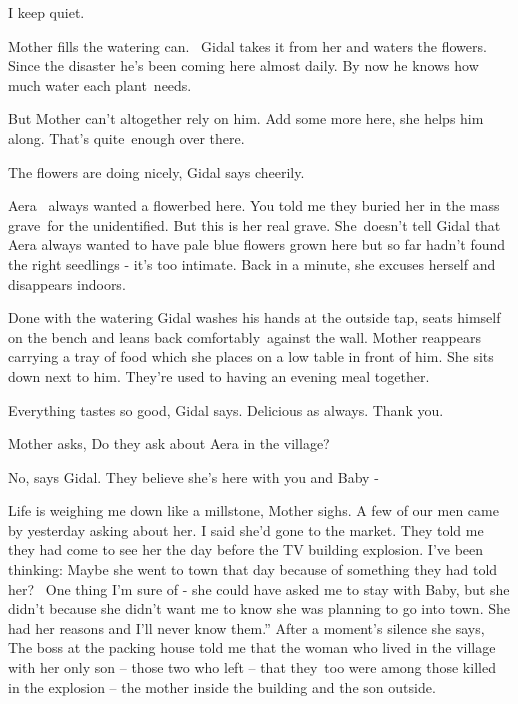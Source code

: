 \documentclass[letterpaper]{article}
\begin{document}
{\textquotedbl}I keep quiet.{\textquotedbl}

Mother fills the watering can. ~Gidal takes it from her and waters the flowers. Since the disaster he's been coming here
almost daily. By now he knows how much water each plant~needs. 

But Mother can't altogether rely on him. {\textquotedbl}Add some more here,{\textquotedbl} she helps him along.
{\textquotedbl}That's quite~enough over there.{\textquotedbl} 

{\textquotedbl}The flowers are doing nicely,{\textquotedbl} Gidal says cheerily.

{\textquotedbl}Aera~ always wanted a flowerbed here. You told me they buried her in the mass grave~for the unidentified.
But this is her real grave.{\textquotedbl} She~doesn't tell Gidal that Aera always wanted to have pale blue flowers
grown here but so far hadn't found the right seedlings - it's too intimate. {\textquotedbl}Back in a
minute,{\textquotedbl} she excuses herself and disappears indoors.

Done with the watering Gidal washes his hands at the outside tap, seats himself on the bench and leans back
comfortably~against the wall. Mother reappears carrying a tray of food which she places on a low table in front of him.
She sits down next to him. They're used to having an evening meal together.

{\textquotedbl}Everything tastes so good,{\textquotedbl} Gidal says. {\textquotedbl}Delicious as always. Thank
you.{\textquotedbl} 

Mother asks, {\textquotedbl}Do they ask about Aera in the village?{\textquotedbl} 

{\textquotedbl}No,{\textquotedbl} says Gidal. {\textquotedbl}They believe she's here with you and Baby -{\textquotedbl} 

{\textquotedbl}Life is weighing me down\textcolor[rgb]{0.0,0.4392157,0.7529412}{ }like a millstone,{\textquotedbl}
Mother sighs. {\textquotedbl}A few of our men came by yesterday asking about her. I said she'd gone to the market. They
told me they had come to see her the day before the TV building explosion. I've been thinking: Maybe she went to town
that day because of something they had told her? ~One thing I'm sure of - she could have asked me to stay with Baby,
but she didn't because she didn't want me to know she was planning to go into town. She had her reasons and I'll never
know them.'' After a moment's silence she says, {\textquotedbl}The boss at the packing house told me that the woman who
lived in the village with her only son -- those two who left -- that they~too were among those killed in the explosion
-- the mother inside the building and the son outside.{\textquotedbl} 
\end{document}
